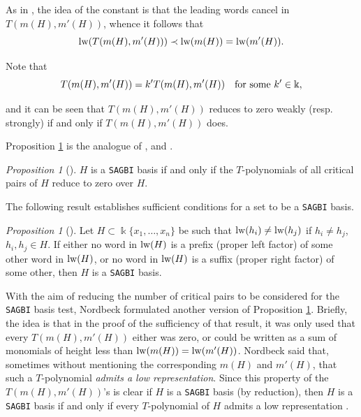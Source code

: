 \documentclass{amsart}
\theoremstyle{definition}
\theoremstyle{remark}
\newtheorem{proposition}[theorem]{Proposition}
\numberwithin{equation}{section}
\begin{document}
As in \cite[Definition 2]{Nordbeck2002}, the idea of the constant is that the leading words cancel in $T(m(H), m'(H))$, whence it follows that 
$$
{\rm lw}(T(m(H), m'(H))) \prec {\rm lw}(m(H)) = {\rm lw}(m'(H)).
$$ 

Note that 
$$
T(m(H), m'(H)) = k' T(m(H), m'(H)) \quad {\rm for\ some} \ k'\in \Bbbk, 
$$

and it can be seen that $T(m(H), m'(H))$ reduces to zero weakly (resp. strongly) if and only if $T(m(H), m'(H))$ does.

Proposition \ref{Nordbeck1998Proposition3} is the analogue of \cite[Theorem 6.6.25 (B1) and (C3)]{KreuzerRobbiano2005}, and \cite[Theorem 1]{Nordbeck2002}.

\begin{proposition}[{\cite[Proposition 3]{Nordbeck1998}}]\label{Nordbeck1998Proposition3}
$H$ is a {\rm \texttt{SAGBI}} basis if and only if the $T$-polynomials of all critical pairs of $H$ reduce to zero over $H$.
\end{proposition}

The following result establishes sufficient conditions for a set to be a \texttt{SAGBI} basis.

\begin{proposition}[{\cite[Proposition 4]{Nordbeck1998}}]\label{Nordbeck1998Proposition4}
Let $H \subset \Bbbk \{x_1, \dotsc, x_n\}$ be such that ${\rm lw}(h_i) \neq {\rm lw}(h_j)$ if $h_i \neq h_j$, $h_i, h_j \in H$. If either no word in ${\rm lw}(H)$ is a prefix {\rm (}proper left factor{\rm )} of some other word in ${\rm lw}(H)$, or no word in ${\rm lw}(H)$ is a suffix {\rm (}proper right factor{\rm )} of some other, then $H$ is a {\rm \texttt{SAGBI}} basis.
\end{proposition}

With the aim of reducing the number of critical pairs to be considered for the \texttt{SAGBI} basis test, Nordbeck formulated another version of Proposition \ref{Nordbeck1998Proposition3}. Briefly, the idea is that in the proof of the sufficiency of that result, it was only used that every $T(m(H), m'(H))$ either was zero, or could be written as a sum of monomials of height less than ${\rm lw}(m(H)) = {\rm lw}(m'(H))$. Nordbeck said that, sometimes without mentioning the corresponding $m(H)$ and $m'(H)$, that such a $T$-polynomial {\em admits a low representation}. Since this property of the $T(m(H), m'(H))$'s is clear if $H$ is a \texttt{SAGBI} basis (by reduction), then $H$ is a \texttt{SAGBI} basis if and only if every $T$-polynomial of $H$ admits a low representation \cite[Proposition 5]{Nordbeck1998}.
\end{document}
